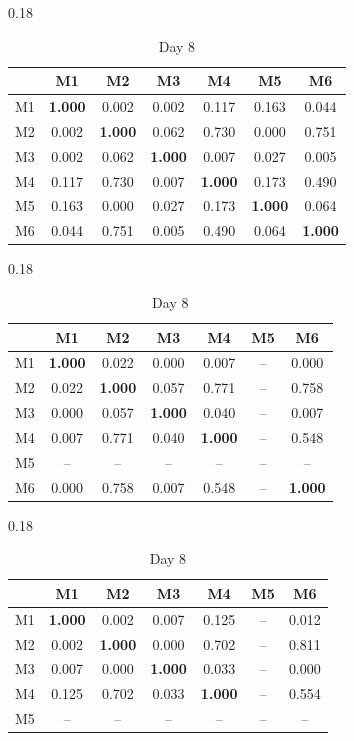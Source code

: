 \begin{table}[htbp]
\begin{subtable}[t]{0.18\linewidth}
\centering
\caption*{Day 6}
\begin{tabular}{ccccccc}
\toprule
& M1 & M2 & M3 & M4 & M5 & M6 \\
\midrule
M1 & \textbf{1.000} & 0.002 & 0.002 & 0.117 & 0.163 & 0.044 \\
M2 & 0.002 & \textbf{1.000} & 0.062 & 0.730 & 0.000 & 0.751 \\
M3 & 0.002 & 0.062 & \textbf{1.000} & 0.007 & 0.027 & 0.005 \\
M4 & 0.117 & 0.730 & 0.007 & \textbf{1.000} & 0.173 & 0.490 \\
M5 & 0.163 & 0.000 & 0.027 & 0.173 & \textbf{1.000} & 0.064 \\
M6 & 0.044 & 0.751 & 0.005 & 0.490 & 0.064 & \textbf{1.000} \\
\bottomrule
\end{tabular}
\end{subtable}
\hfill
\begin{subtable}[t]{0.18\linewidth}
\centering
\caption*{Day 7}
\begin{tabular}{ccccccc}
\toprule
& M1 & M2 & M3 & M4 & M5 & M6 \\
\midrule
M1 & \textbf{1.000} & 0.022 & 0.000 & 0.007 & -- & 0.000 \\
M2 & 0.022 & \textbf{1.000} & 0.057 & 0.771 & -- & 0.758 \\
M3 & 0.000 & 0.057 & \textbf{1.000} & 0.040 & -- & 0.007 \\
M4 & 0.007 & 0.771 & 0.040 & \textbf{1.000} & -- & 0.548 \\
M5 & -- & -- & -- & -- & -- & -- \\
M6 & 0.000 & 0.758 & 0.007 & 0.548 & -- & \textbf{1.000} \\
\bottomrule
\end{tabular}
\end{subtable}
\hfill
\begin{subtable}[t]{0.18\linewidth}
\centering
\caption*{Day 8}
\begin{tabular}{ccccccc}
\toprule
& M1 & M2 & M3 & M4 & M5 & M6 \\
\midrule
M1 & \textbf{1.000} & 0.002 & 0.007 & 0.125 & -- & 0.012 \\
M2 & 0.002 & \textbf{1.000} & 0.000 & 0.702 & -- & 0.811 \\
M3 & 0.007 & 0.000 & \textbf{1.000} & 0.033 & -- & 0.000 \\
M4 & 0.125 & 0.702 & 0.033 & \textbf{1.000} & -- & 0.554 \\
M5 & -- & -- & -- & -- & -- & -- \\

\end{tabular}
\end{subtable}
\end{table}
